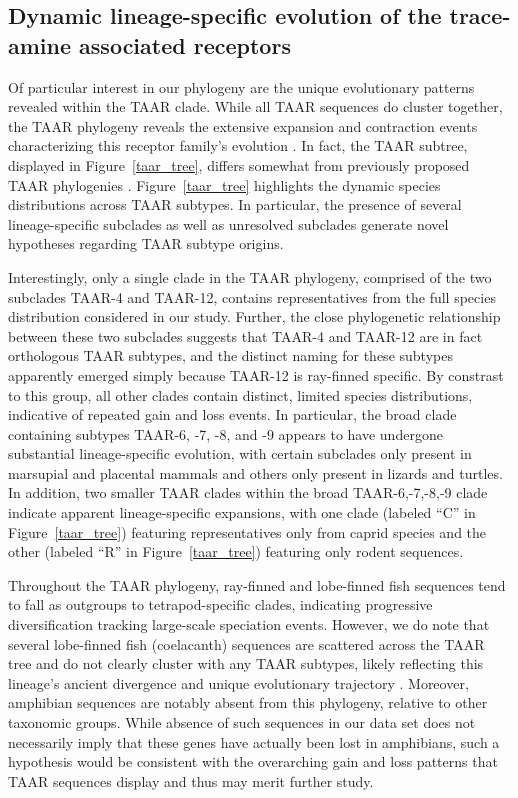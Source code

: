 \documentclass[fleqn,10pt]{wlpeerj}
\begin{document}
\subsection*{Dynamic lineage-specific evolution of the trace-amine associated receptors}
Of particular interest in our phylogeny are the unique evolutionary patterns revealed within the TAAR clade. While all TAAR sequences do cluster together, the TAAR phylogeny reveals the extensive expansion and contraction events characterizing this receptor family's evolution \citep{Lindemann2005,Hashiguchi2007,Staubert2010,Staubert2013}. In fact, the TAAR subtree, displayed in Figure~\ref{taar_tree}, differs somewhat from previously proposed TAAR phylogenies \citep{Lindemann2005, Hashiguchi2007}. Figure~\ref{taar_tree} highlights the dynamic species distributions across TAAR subtypes. In particular, the presence of several lineage-specific subclades as well as unresolved subclades generate novel hypotheses regarding TAAR subtype origins. 

Interestingly, only a single clade in the TAAR phylogeny, comprised of the two subclades TAAR-4 and TAAR-12, contains representatives from the full species distribution considered in our study. Further, the close phylogenetic relationship between these two subclades suggests that TAAR-4 and TAAR-12 are in fact orthologous TAAR subtypes, and the distinct naming for these subtypes apparently emerged simply because TAAR-12 is ray-finned specific. By constrast to this group, all other clades contain distinct, limited species distributions, indicative of repeated gain and loss events. In particular, the broad clade containing subtypes TAAR-6, -7, -8, and -9 appears to have undergone substantial lineage-specific evolution, with certain subclades only present in marsupial and placental mammals and others only present in lizards and turtles. In addition, two smaller TAAR clades within the broad TAAR-6,-7,-8,-9 clade indicate apparent lineage-specific expansions, with one clade (labeled ``C'' in Figure~\ref{taar_tree}) featuring representatives only from caprid species and the other (labeled ``R'' in Figure~\ref{taar_tree}) featuring only rodent sequences.

Throughout the TAAR phylogeny, ray-finned and lobe-finned fish sequences tend to fall as outgroups to tetrapod-specific clades, indicating progressive diversification tracking large-scale speciation events. However, we do note that several lobe-finned fish (coelacanth) sequences are scattered across the TAAR tree and do not clearly cluster with any TAAR subtypes, likely reflecting this lineage's ancient divergence and unique evolutionary trajectory \citep{coelacanth2013}. Moreover, amphibian sequences are notably absent from this phylogeny, relative to other taxonomic groups. While absence of such sequences in our data set does not necessarily imply that these genes have actually been lost in amphibians, such a hypothesis would be consistent with the overarching gain and loss patterns that TAAR sequences display and thus may merit further study.
\end{document}
